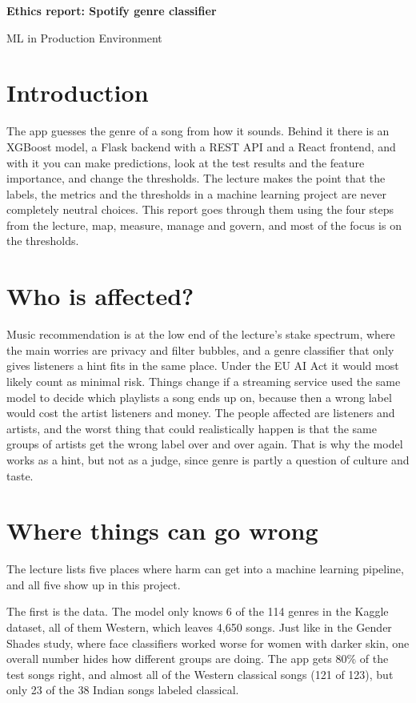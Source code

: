 \documentclass[11pt,a4paper]{article}
\begin{document}
\begin{center}
  {\Large\bfseries Ethics report: Spotify genre classifier\par}
  \medskip
  ML in Production Environment\par
\end{center}
\medskip

\section{Introduction}

The app guesses the genre of a song from how it sounds. Behind it there is an XGBoost model, a Flask backend with a REST API and a React frontend, and with it you can make predictions, look at the test results and the feature importance, and change the thresholds. The lecture makes the point that the labels, the metrics and the thresholds in a machine learning project are never completely neutral choices. This report goes through them using the four steps from the lecture, map, measure, manage and govern, and most of the focus is on the thresholds.

\section{Who is affected?}

Music recommendation is at the low end of the lecture's stake spectrum, where the main worries are privacy and filter bubbles, and a genre classifier that only gives listeners a hint fits in the same place. Under the EU AI Act it would most likely count as minimal risk. Things change if a streaming service used the same model to decide which playlists a song ends up on, because then a wrong label would cost the artist listeners and money. The people affected are listeners and artists, and the worst thing that could realistically happen is that the same groups of artists get the wrong label over and over again. That is why the model works as a hint, but not as a judge, since genre is partly a question of culture and taste.

\section{Where things can go wrong}

The lecture lists five places where harm can get into a machine learning pipeline, and all five show up in this project.

The first is the data. The model only knows 6 of the 114 genres in the Kaggle dataset, all of them Western, which leaves 4,650 songs. Just like in the Gender Shades study, where face classifiers worked worse for women with darker skin, one overall number hides how different groups are doing. The app gets 80\% of the test songs right, and almost all of the Western classical songs (121 of 123), but only 23 of the 38 Indian songs labeled classical.
\end{document}
